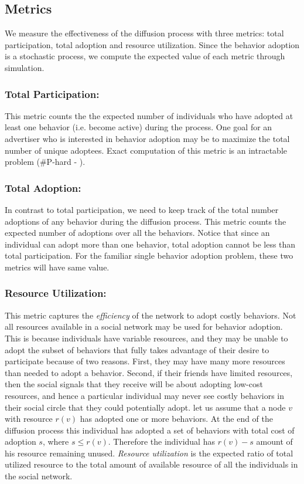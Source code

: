 \documentclass[letterpaper]{article}
\theoremstyle{plain} 		\newtheorem{thm}{Theorem}[section]
\theoremstyle{definition} 	\newtheorem{defn}[thm]{Definition}
\theoremstyle{remark}		\newtheorem{rem}{Remark}
\begin{document}
\subsection{Metrics}
We measure the effectiveness of the diffusion process with three metrics: total participation, total adoption and resource utilization. Since the behavior adoption is a stochastic process, we compute the expected value of each metric through simulation.

\subsubsection{Total Participation:}
This metric counts the the expected number of individuals who have adopted at least one behavior (i.e. become active) during the process. One goal for an advertiser who is interested in behavior adoption may be to maximize the total number of unique adoptees. Exact computation of this metric is an intractable problem (\#P-hard - \cite{Chen10}). 

\subsubsection{Total Adoption:}
In contrast to total participation, we need to keep track of the total number adoptions of any behavior during the diffusion process. This metric counts the expected number of adoptions over all the behaviors. Notice that since an individual can adopt more than one behavior, total adoption cannot be less than total participation. For the familiar single behavior adoption problem, these two metrics will have same value.

\subsubsection{Resource Utilization:}
This metric captures the \textit{efficiency} of the network to adopt costly behaviors. 
Not all resources available in a social network may be used for behavior adoption. This is  because individuals have variable resources, and they may be unable to adopt the subset of behaviors that fully takes advantage of their desire to participate because of two reasons. First, they may have many more resources than needed to adopt a behavior. Second, if their friends have limited resources, then the social signals that they receive will be about adopting low-cost resources, and hence a particular individual may never see costly behaviors in their social circle that they could potentially adopt.  let us assume that a node $v$ with resource $r(v)$ has adopted one or more behaviors. At the end of the diffusion process this individual has adopted a set of behaviors with total cost of adoption $s$, where  $s \le r(v)$. Therefore the individual has $r(v)-s$ amount of his resource remaining unused. \textit{Resource utilization} is the expected ratio of total utilized resource to the total amount of available resource of all the individuals in the social network. 
\end{document}
